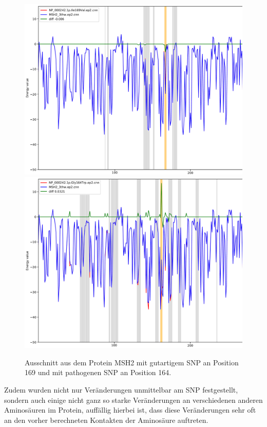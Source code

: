 \begin{figure}
    \centering
    \includegraphics[width=.95\textwidth]{images/comp_plot_Ile169Val.png}
    \includegraphics[width=.95\textwidth]{images/comp_plot_Gly164Trp.png}
    \caption{Ausschnitt aus dem Protein MSH2 mit gutartigem \ac{SNP} an Position 169 und mit pathogenen \ac{SNP} an Position 164.}
    \label{fig:comp_plot}
\end{figure}


Zudem wurden nicht nur Veränderungen unmittelbar am SNP festgestellt, sondern auch einige nicht ganz so starke Veränderungen an verschiedenen anderen Aminosäuren im Protein, auffällig hierbei ist, dass diese Veränderungen sehr oft an den vorher berechneten Kontakten der Aminosäure auftreten. 

